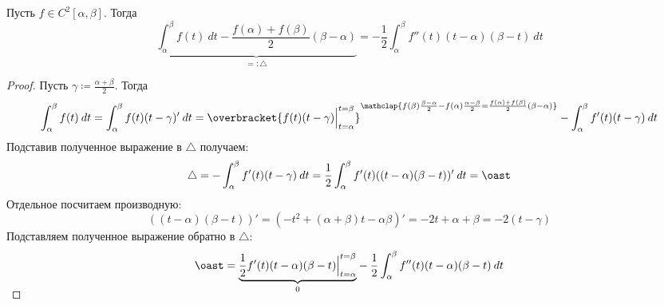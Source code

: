 \begin{lemma}
    Пусть $f \in C^{2}[\alpha, \beta]$. Тогда
    \begin{equation*}
        \underbrace{\int_{\alpha}^{\beta} f(t) \: dt - \frac{f(\alpha) + f(\beta)}{2}(\beta - \alpha)}_{=: \triangle} =
        -\frac{1}{2} \int_{\alpha}^{\beta} f''(t)(t - \alpha)(\beta - t) \: dt
    \end{equation*}
\end{lemma}
\begin{proof}
    Пусть $\gamma \coloneqq \frac{\alpha + \beta}{2}$. Тогда
    \begin{equation*}
            \int_{\alpha}^{\beta} f(t) \: dt = \int_{\alpha}^{\beta} f(t)(t - \gamma)'
            \: dt = \overbracket{f(t)(t - \gamma) \Big|_{t = \alpha}^{t = \beta}}^
            {\mathclap{f(\beta)\frac{\beta - \alpha}{2} - f(\alpha)\frac{\alpha - \beta}{2}
            = \frac{f(\alpha) + f(\beta)}{2}(\beta - \alpha)}}
            -\int_{\alpha}^{\beta} f'(t)(t - \gamma) \: dt
    \end{equation*}
    Подставив полученное выражение в $\triangle$ получаем:
    \begin{equation*}
            \triangle = - \int_{\alpha}^{\beta} f'(t)(t - \gamma) \: dt = \frac{1}{2}
            \int_{{\alpha}}^{{\beta}} {f'(t)((t - \alpha)(\beta - t))'} \: d{t}
            = \oast
    \end{equation*}
    Отдельное посчитаем производную:
    \begin{equation*}
            ((t - \alpha)(\beta - t))' = (-t^2 + (\alpha + \beta)t - \alpha\beta)' =
            -2t + \alpha + \beta = -2(t - \gamma)
    \end{equation*}
    Подставляем полученное выражение обратно в $\triangle$:
    \begin{equation*}
            \oast =
            \smash{\underbrace{\frac{1}{2} f'(t)(t - \alpha)(\beta - t) \Big|_{t = \alpha}^{t = \beta}}_{0}}
            - \frac{1}{2} \int_{{\alpha}}^{{\beta}} {f''(t)(t - \alpha)(\beta - t)} \: d{t}
    \end{equation*}
\end{proof}

